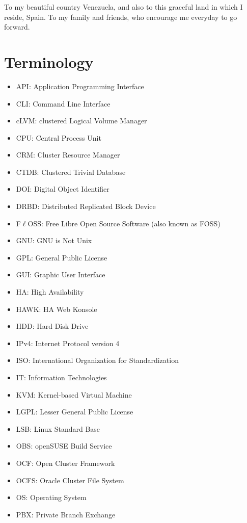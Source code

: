 \documentclass[a4paper, 12pt]{book}
\begin{document}
\noindent To my beautiful country Venezuela, and also to this graceful land in which I reside, Spain. To my family and friends, who encourage me everyday to go forward.


%
\chapter*{Terminology}
\label{chap:terminology}

\begin{itemize}[label={}]
	\item API: Application Programming Interface
	\item CLI: Command Line Interface
	\item cLVM: clustered Logical Volume Manager
	\item CPU: Central Process Unit
	\item CRM: Cluster Resource Manager
	\item CTDB: Clustered Trivial Database
	\item DOI: Digital Object Identifier
	\item DRBD: Distributed Replicated Block Device
	\item F$\ell$OSS: Free Libre Open Source Software (also known as FOSS)
	\item GNU: GNU is Not Unix
	\item GPL:  General Public License
	\item GUI: Graphic User Interface
	\item HA: High Availability
	\item HAWK: HA Web Konsole
	\item HDD: Hard Disk Drive
	\item IPv4: Internet Protocol version 4
	\item ISO: International Organization for Standardization
	\item IT: Information Technologies
	\item KVM: Kernel-based Virtual Machine
	\item LGPL: Lesser General Public License
	\item LSB: Linux Standard Base
	\item OBS: openSUSE Build Service
	\item OCF: Open Cluster Framework
	\item OCFS: Oracle Cluster File System
	\item OS: Operating System
	\item PBX: Private Branch Exchange

\end{itemize}
\end{document}
